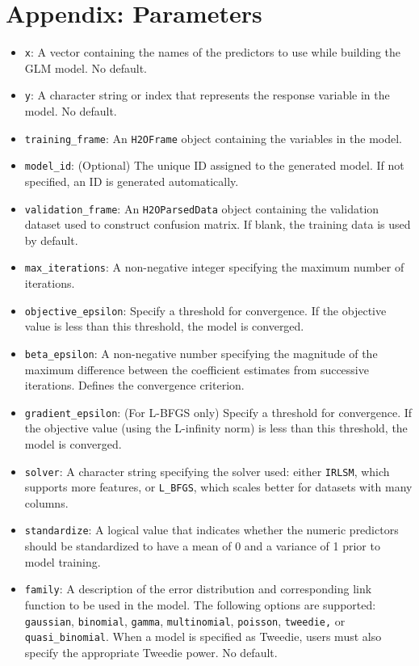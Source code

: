 \section{Appendix: Parameters}
\begin{itemize}
\item \texttt{x}: A vector containing the names of the predictors to use while building the GLM model. No default.
\item \texttt{y}: A character string or index that represents the response variable in the model. No default.
\item \texttt{training\_frame}: An \texttt{H2OFrame} object containing the variables in the model. 
\item \texttt{model\_id}: (Optional) The unique ID assigned to the generated model. If not specified, an ID is generated automatically.
\item \texttt{validation\_frame}: An \texttt{H2OParsedData} object containing the validation dataset used to construct confusion matrix. If  blank, the training data is used by default.
\item \texttt{max\_iterations}: A non-negative integer specifying the maximum number of iterations. 
\item \texttt{objective\_epsilon}: Specify a threshold for convergence. If the objective value is less than this threshold, the model is converged.
\item \texttt{beta\_epsilon}: A non-negative number specifying the magnitude of the maximum difference between the coefficient estimates from successive iterations. Defines the convergence criterion. 
\item \texttt{gradient\_epsilon}: (For L-BFGS only) Specify a threshold for convergence. If the objective value (using the L-infinity norm) is less than this threshold, the model is converged.
\item \texttt{solver}: A character string specifying the solver used: either \texttt{IRLSM}, which supports more features, or \texttt{L\_BFGS}, which scales better for datasets with many columns. 
\item \texttt{standardize}: A logical value that indicates whether the numeric predictors should be standardized to have a mean of 0 and a variance of 1 prior to model training. 
\item \texttt{family}: A description of the error distribution and corresponding link function to be used in the model. The following options are supported: \texttt{gaussian}, \texttt{binomial}, \texttt{gamma}, \texttt{multinomial}, \texttt{poisson}, \texttt{tweedie,} or \texttt{quasi\_binomial}. When a model is specified as Tweedie, users must also specify the appropriate Tweedie power. No default. %

\end{itemize}
